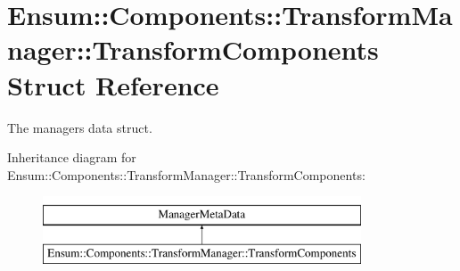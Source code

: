 \hypertarget{struct_ensum_1_1_components_1_1_transform_manager_1_1_transform_components}{}\section{Ensum\+:\+:Components\+:\+:Transform\+Manager\+:\+:Transform\+Components Struct Reference}
\label{struct_ensum_1_1_components_1_1_transform_manager_1_1_transform_components}


The managers data struct.  


Inheritance diagram for Ensum\+:\+:Components\+:\+:Transform\+Manager\+:\+:Transform\+Components\+:\begin{figure}[H]
\begin{center}
\leavevmode
\includegraphics[height=2.000000cm]{struct_ensum_1_1_components_1_1_transform_manager_1_1_transform_components}
\end{center}
\end{figure}
